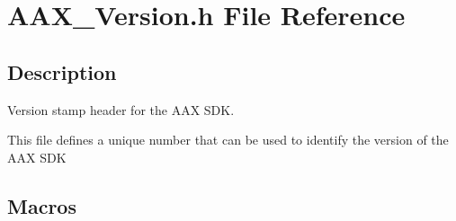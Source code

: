 \hypertarget{a00308}{}\section{A\+A\+X\+\_\+\+Version.\+h File Reference}
\label{a00308}


\subsection{Description}
Version stamp header for the A\+A\+X S\+D\+K. 

This file defines a unique number that can be used to identify the version of the A\+A\+X S\+D\+K \subsection*{Macros}
